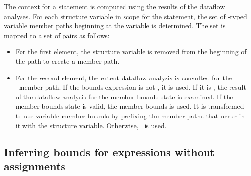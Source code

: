 The context for a statement is computed using the results of the dataflow analyses.
For each structure variable in scope for the statement, the set of \arrayptr-typed variable member paths 
beginning at the variable is determined.  The set is mapped to a set of pairs as follows:
\begin{itemize}
\item For the first element, the structure variable is removed from the beginning of the
path to create a member path.
\item For the second element, the extent dataflow analysis is consulted for the \arrayptr\ member path.
   If the bounds expression is not \boundsunknown, it is used.   If it is \boundsunknown, the result
   of the dataflow analysis for the member bounds state is examined. If the member bounds
   state is valid, the member bounds is used.  It is transformed to use variable member
   bounds by prefixing the member paths that occur in it with the structure variable.
   Otherwise, \boundsunknown\ is used.
\end{itemize}

\subsection{Inferring bounds for expressions without assignments}

